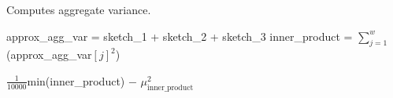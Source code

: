 \begin{algorithm}[H]
    \label{alg:merge_and_variance}
    \caption{Computes aggregate variance.}
    \DontPrintSemicolon

    \;
    approx\_agg\_var = sketch\_1 + sketch\_2 + sketch\_3\;
    inner\_product = $\sum_{j=1}^{w}$ (approx\_agg\_var$[j]^2$)\;
    
    \Return $\frac{1}{10000}$min(inner\_product) $-$ $\mu^2_{\textrm{inner\_product}}$

\end{algorithm}